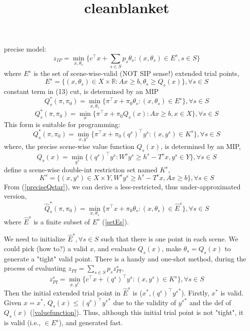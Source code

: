 \documentclass{article}
\title{cleanblanket}
\begin{document}
\begin{multicols}{2}
precise model:
\begin{equation}
    z_{IP} = \min_{x,\theta_s} \{ c^\top x + \sum_{s \in S} p_s \theta_s : (x,\theta_s) \in E^s, s \in S \}
\end{equation}
where $E^s$ is the set of scene-wise-valid (NOT SIP sense!) extended trial points,
\begin{equation}\label{setEs}
    E^s = \{ (x,\theta_s) \in X \times \mathbb{R} : Ax \ge b, \theta_s \ge Q_s(x) \}, \forall s \in S
\end{equation}
constant term in (13) cut, is determined by an MIP
\begin{equation}\label{preciseQstar}
    Q^{\ast}_s(\pi,\pi_0) = \min_{x,\theta_s} \{ \pi^\top x + \pi_0 \theta_s : (x,\theta_s) \in E^s \}, \forall s \in S
\end{equation}
\begin{equation}
    Q^{\ast}_s(\pi,\pi_0) = \min_{x} \{ \pi^\top x + \pi_0 Q_s(x) : Ax \ge b, x \in X \}, \forall s \in S
\end{equation}
This form is suitable for programming:
\begin{equation}
    Q^{\ast}_s(\pi,\pi_0) = \min_{x,y^s} \{ \pi^\top x + \pi_0 (q^s)^\top y^s : (x,y^s) \in K^s \}, \forall s \in S
\end{equation}
where, the precise scene-wise value function $Q_s(x)$, is determined by an MIP,
\begin{equation}\label{valuefunction}
    Q_s(x) = \min_{y^s} \{ (q^s)^\top y^s : W^s y^s \ge h^s - T^s x , y^s \in Y \}, \forall s \in S
\end{equation}
define a scene-wise double-int restriction set named $K^s$,
\begin{equation}
    K^s = \{ (x,y^s) \in X \times Y, W^s y^s \ge h^s - T^s x, Ax \ge b \}, \forall s \in S
\end{equation}
From (\ref{preciseQstar}), we can derive a less-restricted, thus under-approximated version,
\begin{equation}
    \hat Q^{\ast}_s(\pi,\pi_0) = \min_{x,\theta_s} \{ \pi^\top x + \pi_0 \theta_s : (x,\theta_s) \in \hat E^s \}, \forall s \in S
\end{equation}
where $\hat E^s$ is a finite subset of $E^s$ (\ref{setEs}).

We need to initialize $\hat E^s, \forall s \in S$ such that there is one point in each scene.
We could pick (how to?) a valid $x$, and evaluate $Q_s(x)$, make $\theta_s = Q_s(x)$ to generate a "tight" valid point.
There is a handy and one-shot method, during the process of evaluating $z_{PI} = \sum_{s \in S} p_s z_{PI}^s$,
\begin{equation}
    z_{PI}^s = \min_{x,y^s} \{ c^\top x + (q^s)^\top y^s : (x,y^s) \in K^s \}, \forall s \in S 
\end{equation}
Then the initial extended trial point in $\hat E^s$ is ($x^\ast$,$(q^s)^\top {y^s}^\ast$). Firstly, $x^\ast$ is valid.
Given $x=x^\ast$, $Q_s(x) \le (q^s)^\top {y^s}^\ast$ due to the validity of ${y^s}^\ast$ and the def of $Q_s(x)$ (\ref{valuefunction}).
Thus, although this initial trial point is not "tight", it is valid (i.e., $\in E^s$), and generated fast.


\blindtext
\blindtext
\blindtext
\blindtext
\blindtext
\blindtext

\end{multicols}
\end{document}

